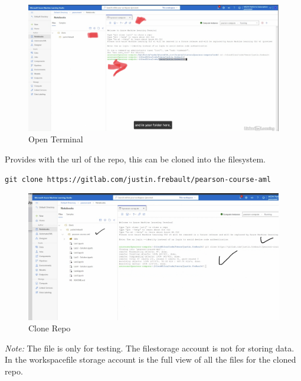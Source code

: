 \begin{figure}[H]
	\centering
	\includegraphics[scale = 0.2]{attachment/chapter_10/Scc042}
	\caption{Open Terminal}
\end{figure}

Provides with the url of the repo, this can be cloned into the filesystem. 
\begin{lstlisting}[style=CMD]
	git clone https://gitlab.com/justin.frebault/pearson-course-aml
\end{lstlisting}

\begin{figure}[H]
	\centering
	\includegraphics[scale = 0.3]{attachment/chapter_10/Scc043}
	\caption{Clone Repo}
\end{figure}

\textit{Note:} The file is only for testing. The filestorage account is not for storing data. In the workspacefile storage account is the full view of all the files for the cloned repo.

